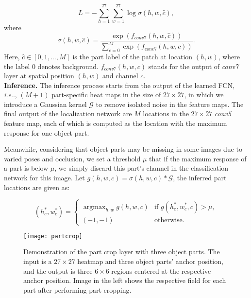 \documentclass[10pt,twocolumn,letterpaper]{article}
\makeatletter
\DeclareMathOperator*{\argmax}{argmax}
\DeclareRobustCommand\onedot{\futurelet\@let@token\@onedot}
\def\@onedot{\ifx\@let@token.\else.\null\fi\xspace}
\def\ie{\emph{i.e}\onedot} \def\Ie{\emph{I.e}\onedot}
\makeatother
\begin{document}
\begin{equation}\label{eqn:fcnloss}
L = -\sum_{h=1}^{27}\sum_{w=1}^{27} \log\sigma(h,w,\hat{c}),
\end{equation}
where
\begin{displaymath}
\sigma(h,w,\hat{c}) = \frac{\exp(f_{conv7}(h,w,\hat{c}))}{\sum_{c=0}^M \exp(f_{conv7}(h,w,c))}.
\end{displaymath}
Here, $\hat{c}\in[0,1,...,M]$ is the part label of the patch at location $(h,w)$, where the label $0$ denotes background. $f_{conv7}(h,w,c)$ stands for the output of \textit{conv7} layer at spatial position $(h,w)$ and channel $c$.
\\



\noindent\textbf{Inference.} The inference process starts from the output of the learned FCN, \ie, $(M+1)$ part-specific heat maps in the size of $27\times27$, in which we introduce a Gaussian kernel $\mathcal{G}$ to remove isolated noise in the feature maps. The final output of the localization network are $M$ locations in the $27\times27$ \textit{conv5} feature map, each of which is computed as the location with the maximum response for one object part. 

Meanwhile, considering that object parts may be missing in some images due to varied poses and occlusion, we set a threshold $\mu$ that if the maximum response of a part is below $\mu$, we simply discard this part's channel in the classification network for this image. Let $g(h,w,c)=\sigma(h,w,c)*\mathcal{G}$, the inferred part locations are given as:

\begin{equation}
(h_c^*,w_c^*)=
  \left\{
   \begin{array}{ll}
   \argmax_{h,w} g(h,w,c) & \text{if } g(h_c^*,w_c^*,c)>\mu, \\
   (-1,-1) & \text{otherwise.}
   \end{array}
  \right.
\end{equation}

\begin{figure}[t]
\begin{center}
\texttt{[image: partcrop]}
\end{center}
   \caption{Demonstration of the part crop layer with three object parts. The input is a $27\times27$ heatmap and three object parts' anchor position, and the output is three $6\times6$ regions centered at the respective anchor position. Image in the left shows the respective field for each part after performing part cropping.}
\label{fig:partcrop}
\end{figure}
\end{document}

